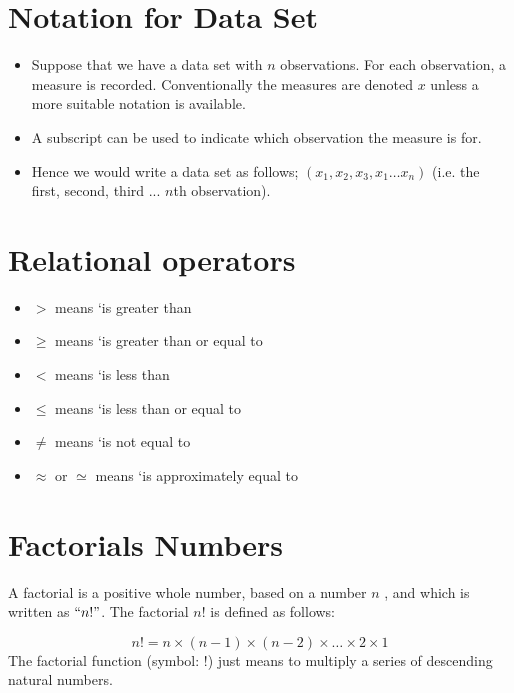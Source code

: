 \documentclass[]{report}
\begin{document}




\section{Notation for Data Set}

\begin{itemize}
	\item Suppose that we have a data set with $n$ observations. For each observation, a measure is recorded. Conventionally the measures are denoted $x$ unless a more suitable notation is available. 
	\item A subscript can be used to indicate which observation the measure is for.
	\item Hence we would write a data set as follows; $(x_{1}, x_{2},x_{3} , x_{1} \dots x_{n})$ (i.e. the first, second, third ... $n$th observation).
\end{itemize}


\section{Relational operators}
\begin{itemize}
	\item $>$  means `is greater than
	\item $\geq$ means `is greater than or equal to
	\item $<$ means `is less than
	\item $\leq$ means `is less than or equal to
	\item $\neq$ means `is not equal to
	\item $\approx$ or $\simeq$ means `is approximately equal to
\end{itemize}





\section{Factorials Numbers}

A factorial is a positive whole number, based on a number $n$ , and which is written as $``n!"$. The factorial $n!$ is defined as follows:

\[n!  =n \times (n-1) \times (n-2) \times \ldots \times 2 \times 1 \]
The factorial function (symbol: !) just means to multiply a series of descending natural numbers. \\ \bigskip
\end{document}
